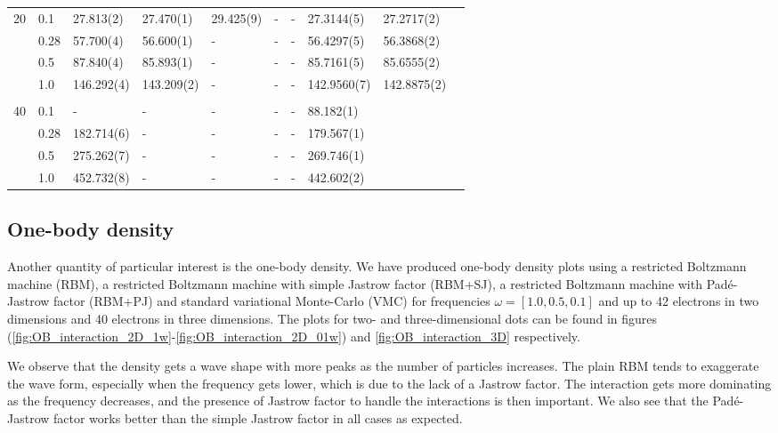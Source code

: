 {\begin{landscape}
\begin{table}
\begin{tabularx}{\hsize}{llR{2.3cm}R{2.3cm}R{2.3cm}R{2.3cm}R{2.3cm}R{2.3cm}R{2.3cm}R{2.2cm}}
		20 & 0.1 & 27.813(2) & 27.470(1) & 29.425(9) & - & - & 27.3144(5) & 27.2717(2) \\ 
		& 0.28 & 57.700(4) & 56.600(1) & - & - & - & 56.4297(5) & 56.3868(2) \\
		& 0.5 & 87.840(4) & 85.893(1) & - & - & - & 85.7161(5) & 85.6555(2) \\
		& 1.0 & 146.292(4) & 143.209(2) & - & - & - & 142.9560(7) & 142.8875(2) \\ \hdashline \\
		
		40 & 0.1 & - & - & - & - & - & 88.182(1) \\ 
		& 0.28 & 182.714(6) & - & - & - & - & 179.567(1) \\
		& 0.5 & 275.262(7) & - & - & - & - & 269.746(1) \\
		& 1.0 & 452.732(8) & - & - & - & - & 442.602(2) \\ \hline\hline
	\end{tabularx}
\end{table}
\end{landscape}
}

\newpage
\subsection{One-body density}
Another quantity of particular interest is the one-body density. We have produced one-body density plots using a restricted Boltzmann machine (RBM), a restricted Boltzmann machine with simple Jastrow factor (RBM+SJ), a restricted Boltzmann machine with Padé-Jastrow factor (RBM+PJ) and standard variational Monte-Carlo (VMC) for frequencies $\omega=[1.0,0.5,0.1]$ and up to 42 electrons in two dimensions and 40 electrons in three dimensions. The plots for two- and three-dimensional dots can be found in figures (\ref{fig:OB_interaction_2D_1w}-\ref{fig:OB_interaction_2D_01w}) and \ref{fig:OB_interaction_3D} respectively.

We observe that the density gets a wave shape with more peaks as the number of particles increases. The plain RBM tends to exaggerate the wave form, especially when the frequency gets lower, which is due to the lack of a Jastrow factor. The interaction gets more dominating as the frequency decreases, and the presence of Jastrow factor to handle the interactions is then important. We also see that the Padé-Jastrow factor works better than the simple Jastrow factor in all cases as expected.

